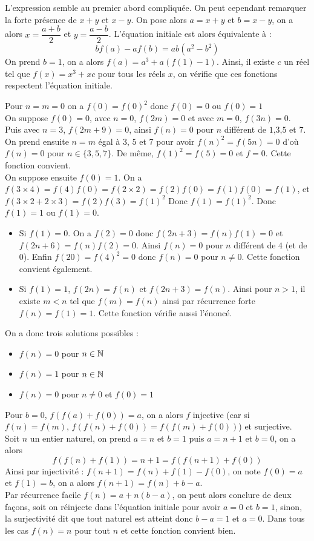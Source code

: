 \begin{sol}[][7]
L'expression semble au premier abord compliquée. On peut cependant remarquer la forte présence de $x+y$ et $x-y$. On pose alors $a=x+y$ et $b=x-y$, on a alors $x=\dfrac{a+b}2$ et $y=\dfrac{a-b}2$. L'équation initiale est alors équivalente à : $$bf(a)-af(b)=ab(a^2-b^2)$$ On prend $b=1$, on a alors $f(a)=a^3+a(f(1)-1)$. Ainsi, il existe $c$ un réel tel que $f(x)=x^3+xc$ pour tous les réels $x$, on vérifie que ces fonctions respectent l'équation initiale.
\end{sol}
\begin{sol}[][8]
Pour $n=m=0$ on a $f(0)=f(0)^2$ donc $f(0)=0$ ou $f(0)=1$\\
On suppose $f(0)=0$, avec $n=0$, $f(2m)=0$ et avec $m=0$, $f(3n)=0$. Puis avec $n=3$, $f(2m+9)=0$, ainsi $f(n)=0$ pour $n$ différent de $1$,$3$,$5$ et $7$. On prend ensuite $n=m$ égal à $3$, $5$ et $7$ pour avoir $f(n)^2=f(5n)=0$ d'où $f(n)=0$ pour $n\in\{3,5,7\}$. De même, $f(1)^2=f(5)=0$ et $f=0$. Cette fonction convient.\\
On suppose ensuite $f(0)=1$. On a $f(3 \times 4) = f(4)f(0) = f(2 \times 2) = f(2)f(0) = f(1)f(0) = f(1)$, et $f(3 \times2 +
2 \times 3) = f(2)f(3) = f(1)^2$ Donc $f(1) = f(1)^2$. Donc $f(1) = 1$ ou $f(1) = 0$.\\
\begin{itemize}
    \item Si $f(1)=0$. On a $f(2)=0$ donc $f(2n+3)=f(n)f(1)=0$ et $f(2n+6)=f(n)f(2)=0$. Ainsi $f(n)=0$ pour $n$ différent de $4$ (et de $0$). Enfin $f(20)=f(4)^2=0$ donc $f(n)=0$ pour $n\ne 0$. Cette fonction convient également.
    \item Si $f(1)=1$, $f(2n)=f(n)$ et $f(2n+3)=f(n)$. Ainsi pour $n>1$, il existe $m<n$ tel que $f(m)=f(n)$ ainsi par récurrence forte $f(n)=f(1)=1$. Cette fonction vérifie aussi l'énoncé.
\end{itemize}
On a donc trois solutions possibles :
\begin{itemize}
    \item $f(n)=0$ pour $n\in\mathbb N$
    \item $f(n)=1$ pour $n\in\mathbb N$
    \item $f(n)=0$ pour $n\ne 0$ et $f(0)=1$
\end{itemize}
\end{sol}
\begin{sol}[][9]
Pour $b=0$, $f(f(a)+f(0))=a$, on a alors $f$ injective (car si $f(n)=f(m)$, $f(f(n)+f(0))=f(f(m)+f(0))$) et surjective.\\
Soit $n$ un entier naturel, on prend $a=n$ et $b=1$ puis $a=n+1$ et $b=0$, on a alors 
$$f(f(n)+f(1))=n+1=f(f(n+1)+f(0))$$
Ainsi par injectivité : $f(n+1)=f(n)+f(1)-f(0)$, on note $f(0)=a$ et $f(1)=b$, on a alors $f(n+1)=f(n)+b-a$.\\
Par récurrence facile $f(n)=a+n(b-a)$, on peut alors conclure de deux façons, soit on réinjecte dans l'équation initiale pour avoir $a=0$ et $b=1$, sinon, la surjectivité dit que tout naturel est atteint donc $b-a=1$ et $a=0$. Dans tous les cas $f(n)=n$ pour tout $n$ et cette fonction convient bien.
\end{sol}
